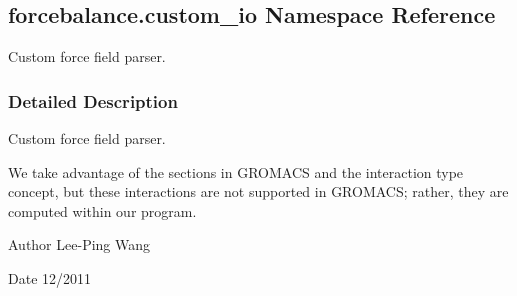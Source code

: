 \hypertarget{namespaceforcebalance_1_1custom__io}{}\subsection{forcebalance.\+custom\+\_\+io Namespace Reference}
\label{namespaceforcebalance_1_1custom__io}


Custom force field parser.  




\subsubsection{Detailed Description}
Custom force field parser. 

We take advantage of the sections in G\+R\+O\+M\+A\+CS and the \textquotesingle{}interaction type\textquotesingle{} concept, but these interactions are not supported in G\+R\+O\+M\+A\+CS; rather, they are computed within our program.

\begin{DoxyAuthor}{Author}
Lee-\/\+Ping Wang 
\end{DoxyAuthor}
\begin{DoxyDate}{Date}
12/2011 
\end{DoxyDate}
